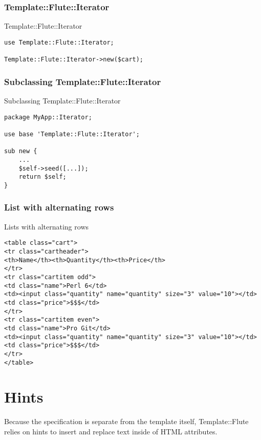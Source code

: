 \subsubsection{Template::Flute::Iterator}
\begin{frame}[fragile]{Template::Flute::Iterator}
\begin{lstlisting}
use Template::Flute::Iterator;

Template::Flute::Iterator->new($cart);
\end{lstlisting}
\end{frame}

\subsubsection{Subclassing Template::Flute::Iterator}
\begin{frame}[fragile]{Subclassing Template::Flute::Iterator}
\begin{lstlisting}
package MyApp::Iterator;

use base 'Template::Flute::Iterator';

sub new {
    ...
    $self->seed([...]);
    return $self;
}
\end{lstlisting}
\end{frame}

\subsubsection{List with alternating rows}
\begin{frame}[fragile]{Lists with alternating rows}
\begin{lstlisting}
<table class="cart">
<tr class="cartheader">
<th>Name</th><th>Quantity</th><th>Price</th>
</tr>
<tr class="cartitem odd">
<td class="name">Perl 6</td>
<td><input class="quantity" name="quantity" size="3" value="10"></td>
<td class="price">$$$</td>
</tr>
<tr class="cartitem even">
<td class="name">Pro Git</td>
<td><input class="quantity" name="quantity" size="3" value="10"></td>
<td class="price">$$$</td>
</tr>
</table>
\end{lstlisting}
\end{frame}

\section{Hints}
Because the specification is separate from the template itself,
Template::Flute relies on hints to insert and replace text
inside of HTML attributes.

